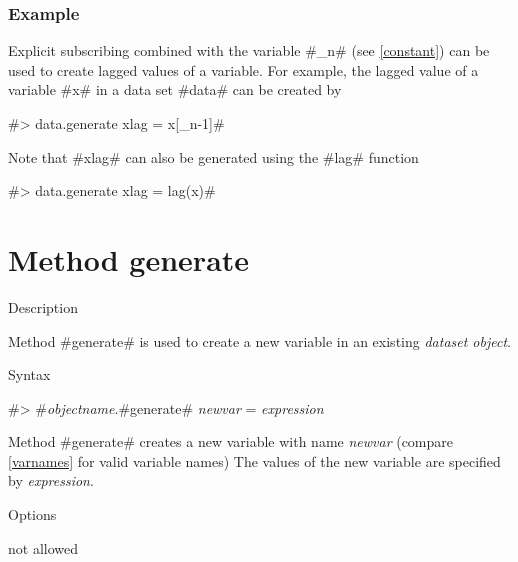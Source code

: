 \subsubsection*{Example}

Explicit subscribing combined with the variable #_n# (see
\autoref{constant}) can be used to create lagged values of a
variable. For example, the lagged value of a variable #x# in a
data set #data# can be created by

#> data.generate xlag = x[_n-1]#

Note that #xlag# can also be generated using the #lag# function

#> data.generate xlag = lag(x)#


\clearpage

\section{Method generate}
\label{generate} 

\begin{stanza}{Description}

Method #generate# is used to create a new variable in an existing
{\em dataset object}.
\end{stanza}


\begin{stanza}{Syntax}

#> #{\em objectname}.#generate# {\em newvar} = {\em expression}

Method #generate# creates a new variable with name {\em newvar}
(compare \autoref{varnames} for valid variable names) The values
of the new variable are specified by {\em expression}.
\end{stanza}


\begin{stanza}{Options}

not allowed
\end{stanza}



